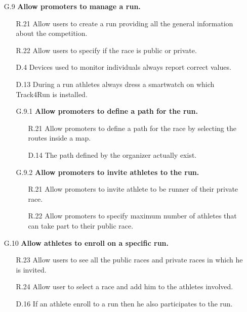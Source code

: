 \begin{enumerate}
\begin{enumerate}
	\item [G.9] \textbf{Allow promoters to manage a run.}
		\begin{enumerate}
		\item [R.21] Allow users to create a run providing all the general information about the competition.
		\item [R.22] Allow users to specify if the race is public or private.
		\item [D.4] Devices used to monitor individuals always report correct values.
		\item [D.13] During a run athletes always dress a smartwatch on which Track4Run is installed.
			
		\item [G.9.1] \textbf{Allow promoters to define a path for the run.}
			\begin{enumerate}
			\item [R.21] Allow promoters to define a path for the race by selecting the routes inside a map.
			\item [D.14] The path defined by the organizer actually exist.
			\end{enumerate}
			
		\item [G.9.2] \textbf{Allow promoters to invite athletes to the run.}
			\begin{enumerate}
			\item [R.21] Allow promoters to invite athlete to be runner of their private race.
			\item [R.22] Allow promoters to specify maximum number of athletes that can take part to their public race.
			\end{enumerate}
	\end{enumerate}
	
	\item [G.10] \textbf{Allow athletes to enroll on a specific run.}
		\begin{enumerate}
		\item [R.23] Allow users to see all the public races and private races in which he is invited.
		\item [R.24] Allow user to select a race and add him to the athletes involved.
		\item [D.16] If an athlete enroll to a run then he also participates to the run.
		\end{enumerate}
	

\end{enumerate}
\end{enumerate}
